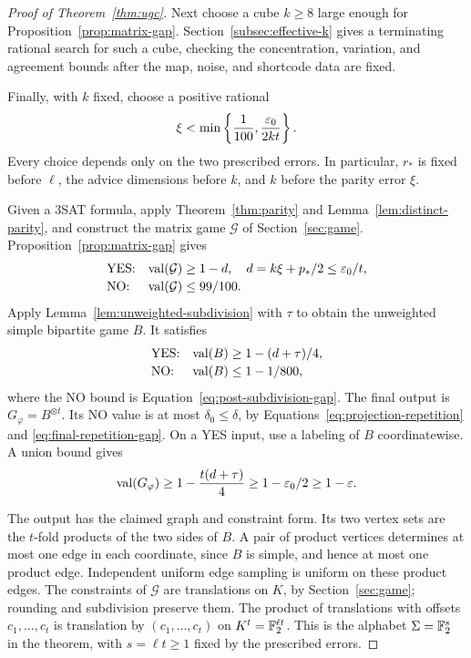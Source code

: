 \begin{proof}[Proof of Theorem~\ref{thm:ugc}]
Next choose a cube $k\ge8$ large enough for
Proposition~\ref{prop:matrix-gap}.
Section~\ref{subsec:effective-k} gives a terminating rational search
for such a cube, checking the concentration, variation, and agreement
bounds after the map, noise, and shortcode data are fixed.

Finally, with $k$ fixed, choose a positive rational
\begin{equation}
 \xi<\min\left\{\frac1{100},\frac{\varepsilon_0}{2kt}\right\}.
 \label{eq:final-parity-error}
\end{equation}
Every choice depends only on the two prescribed errors.  In
particular, $r_*$ is fixed before $\ell$, the advice dimensions before
$k$, and $k$ before the parity error $\xi$.

Given a 3SAT formula, apply Theorem~\ref{thm:parity} and
Lemma~\ref{lem:distinct-parity}, and construct the matrix game $\mathcal G$
of Section~\ref{sec:game}.  Proposition~\ref{prop:matrix-gap} gives
\[
 \begin{array}{ll}
 \text{YES:}&\operatorname{val}(\mathcal G)\ge1-d,
       \quad d=k\xi+p_*/2\le\varepsilon_0/t,\\[2pt]
 \text{NO:}&\operatorname{val}(\mathcal G)\le99/100.
 \end{array}
\]
Apply Lemma~\ref{lem:unweighted-subdivision} with $\tau$ to obtain
the unweighted simple bipartite game $B$.  It satisfies
\[
 \begin{array}{ll}
 \text{YES:}&\operatorname{val}(B)\ge1-(d+\tau)/4,\\[2pt]
 \text{NO:}&\operatorname{val}(B)\le1-1/800,
 \end{array}
\]
where the NO bound is Equation~\eqref{eq:post-subdivision-gap}.
The final output is $G_\varphi=B^{\otimes t}$.  Its NO value is at most
$\delta_0\le\delta$, by Equations~\eqref{eq:projection-repetition}
and \eqref{eq:final-repetition-gap}.  On a YES input, use a labeling
of $B$ coordinatewise.  A union bound gives
\[
 \operatorname{val}(G_\varphi)\ge1-\frac{t(d+\tau)}4
 \ge1-\varepsilon_0/2\ge1-\varepsilon.
\]

The output has the claimed graph and constraint form.  Its two vertex
sets are the $t$-fold products of the two sides of $B$.  A pair of
product vertices determines at most one edge in each coordinate,
since $B$ is simple, and hence at most one product edge.  Independent
uniform edge sampling is uniform on these product edges.  The
constraints of $\mathcal G$ are translations on $K$, by
Section~\ref{sec:game}; rounding and subdivision preserve them.
The product of translations with offsets $c_1,\ldots,c_t$ is
translation by $(c_1,\ldots,c_t)$ on $K^t=\mathbb F_2^{\ell t}$.  This is
the alphabet $\Sigma=\mathbb F_2^s$ in the theorem, with $s=\ell t\ge1$ fixed by
the prescribed errors.


\end{proof}
